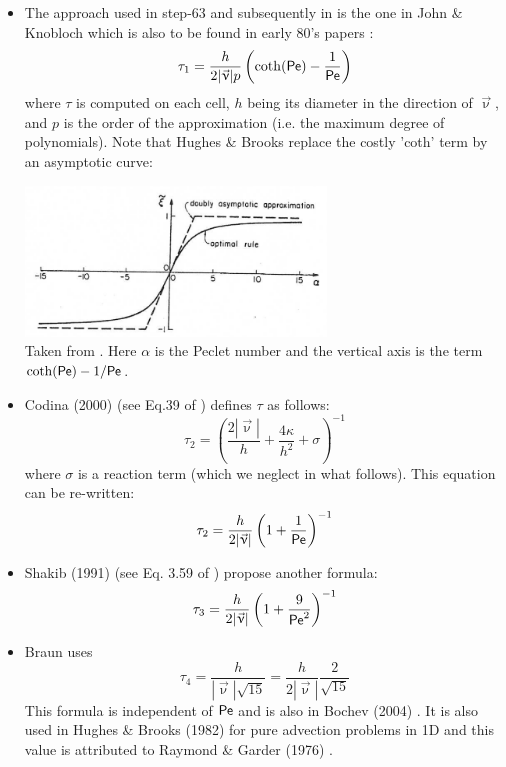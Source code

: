 \begin{itemize}
\item The approach used in step-63 and subsequently in \aspect{} is the 
one in John \& Knobloch \cite{jokn06,knob08} which is also to be found in early 
80's papers \cite{brhu82,hubr82}:
\[
\tau_1 = \frac{h}{2 |\vec\upnu| p} \left( \coth ({\mathsf{Pe}}) - \frac{1}{{\mathsf{Pe}}} \right)
\]
where $\tau$ is computed on each cell, $h$ being its diameter in the direction of $\vec\upnu$, 
and $p$ is the order of the approximation (i.e. the maximum degree of polynomials).
Note that Hughes \& Brooks \cite{hubr82} replace the costly 'coth' term by an asymptotic curve:

\begin{center}
\includegraphics[width=8cm]{images/supg/hubr82}\\
{\captionfont Taken from \cite{hubr82}. Here $\alpha$ is the Peclet number and the vertical axis
is the term $ \coth ({\mathsf{Pe}}) -1/{\mathsf{Pe}}$.}
\end{center}


\item
Codina (2000) (see Eq.39 of \cite{codi00}) defines $\tau$ as follows:
\[
\tau_2= \left( \frac{2 |\vec\upnu|}{h} + \frac{4 \kappa}{h^2} + \sigma   \right)^{-1}
\]
where $\sigma$ is a reaction term (which we neglect in what follows). This equation 
can be re-written:
\[
\tau_2= \frac{h}{2 |\vec\upnu|} \left( 1 + \frac{1}{{\mathsf{Pe}}} \right)^{-1}
\]

\item
Shakib \etal (1991) (see Eq. 3.59 of \cite{shhj91}) propose another formula:
\[
\tau_3= \frac{h}{2 |\vec\upnu|} \left( 1 + \frac{9}{{\mathsf{Pe}}^2} \right)^{-1}
\]

\item
Braun \cite{brau03} uses 
\[
\tau_4 = \frac{h}{|\vec\upnu| \sqrt{15}} = \frac{h}{2|\vec\upnu|} \frac{2}{\sqrt{15}} 
\]
This formula is independent of ${\mathsf{Pe}}$ and is also in Bochev \etal (2004) \cite{bogs04}.
It is also used in Hughes \& Brooks (1982) \cite{hubr82} for pure advection problems in 1D
and this value is attributed to Raymond \& Garder (1976)  \cite{raga76}.


\end{itemize}
